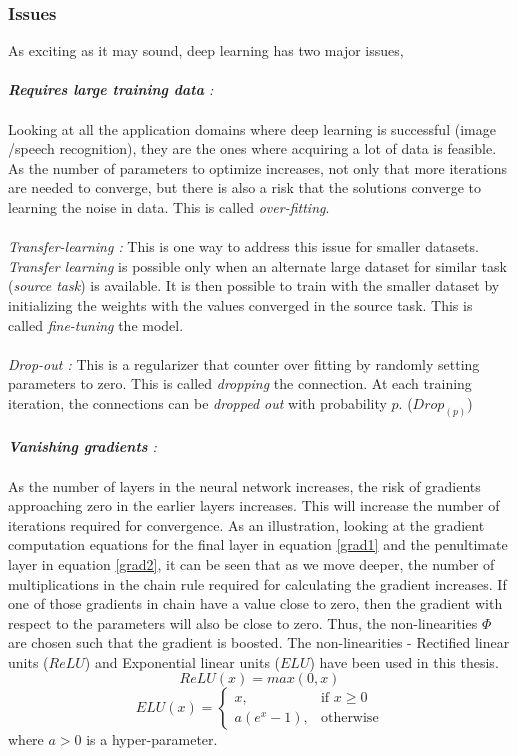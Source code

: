 \subsubsection{Issues}
As exciting as it may sound, deep learning has two major issues,\\
\\
\textit{\textbf{Requires large training data} :}\\
\\
Looking at all the application domains where deep learning is successful (image /speech recognition), they are the ones where acquiring a lot of data is feasible. As the number of parameters to optimize increases, not only that more iterations are needed to converge, but there is also a risk that the solutions converge to learning the noise in data. This is called \textit{over-fitting}.\\
\\
\textit{Transfer-learning :} This is one way to address this issue for smaller datasets. \textit{Transfer learning} is possible only when an alternate large dataset for similar task (\textit{source task}) is available. It is  then possible to train with the smaller dataset by initializing the weights with the values converged in the source task. This is called \textit{fine-tuning} the model.\\
\\
\textit{Drop-out :} This is a regularizer that counter over fitting by randomly setting parameters to zero. This is called \textit{dropping} the connection. At each training iteration, the connections can be \textit{dropped out} with probability $p$. ($Drop_{(p)}$)\\  
\\
\textit{\textbf{Vanishing gradients} :}\\  
\\
As the number of layers in the neural network increases, the risk of gradients approaching zero in the earlier layers increases. This will increase the number of iterations required for convergence. As an illustration, looking at the gradient computation equations for the final layer in equation \ref{grad1} and the penultimate layer in equation \ref{grad2}, it can be seen that as we move deeper, the number of multiplications in the chain rule required for calculating the gradient increases. If one of those gradients in chain have a value close to zero, then the gradient with respect to the parameters will also be close to zero. Thus, the non-linearities $\Phi$ are chosen such that the gradient is boosted. The non-linearities - Rectified linear units ($ReLU$)\cite{relu} and Exponential linear units ($ELU$)\cite{elu} have been used in this thesis.  
\[
ReLU(x) = max(0,x)
\]     
\[
ELU(x) = 
\begin{cases}
x, & \text{if } x \geq 0 \\
a(e^{x}-1), & \text{otherwise}
\end{cases}
\]
where $a > 0$ is a hyper-parameter.